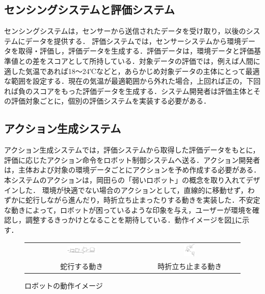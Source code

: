 \documentclass[paper=a4paper,jafontsize=9pt,head_space=15mm,gutter=20mm,
twocolumn,number_of_lines=49, line_length=26zw]{myuarticle}
\begin{document}
\subsection{センシングシステムと評価システム}
センシングシステムは，センサーから送信されたデータを受け取り，以後のシステムにデータを提供する．
評価システムでは，センサーシステムから環境データを取得・評価し，評価データを生成する．評価データは，環境データと評価基準値との差をスコアとして所持している．対象データの評価では，例えば人間に適した気温であれば18～24℃などと，あらかじめ対象データの主体にとって最適な範囲を設定する．現在の気温が最適範囲から外れた場合，上回れば正の，下回れば負のスコアをもった評価データを生成する．システム開発者は評価主体とその評価対象ごとに，個別の評価システムを実装する必要がある．

\subsection{アクション生成システム}
アクション生成システムでは，評価システムから取得した評価データをもとに，評価に応じたアクション命令をロボット制御システムへ送る．アクション開発者は，主体および対象の環境データごとにアクションを予め作成する必要がある．本システムのアクションは，岡田ら\cite{岡田-2017-弱いロボ}の「弱いロボット」の概念を取り入れてデザインした．
環境が快適でない場合のアクションとして，直線的に移動せず，わずかに蛇行しながら進んだり，時折立ち止まったりする動きを実装した．不安定な動きによって，ロボットが困っているような印象を与え，ユーザーが環境を確認し，調整するきっかけとなることを期待している．動作イメージを図\ref{fig:action-image}に示す．

\begin{figure}[h]
 \centering
  \begin{tabular}{cc}
    \includegraphics[width=0.27\textwidth]{resources/action-image-2.png} &
    \includegraphics[width=0.12\textwidth]{resources/action-image-1.png} \\
    蛇行する動き & 時折立ち止まる動き
  \end{tabular}
  \caption{ロボットの動作イメージ}
  \label{fig:action-image}
\end{figure}
\end{document}
